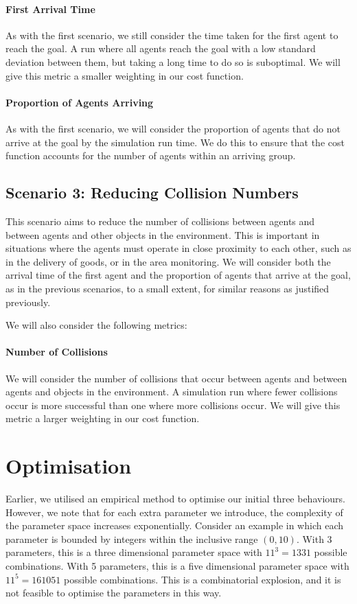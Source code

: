 \documentclass[12pt]{article}
\begin{document}
\paragraph{First Arrival Time} As with the first scenario, we still consider the time taken for the first agent to reach the goal. A run where all agents reach the goal with a low standard deviation between them, but taking a long time to do so is suboptimal. We will give this metric a smaller weighting in our cost function.

\paragraph{Proportion of Agents Arriving} As with the first scenario, we will consider the proportion of agents that do not arrive at the goal by the simulation run time. We do this to ensure that the cost function accounts for the number of agents within an arriving group.

\subsection{Scenario 3: Reducing Collision Numbers}
This scenario aims to reduce the number of collisions between agents and between agents and other objects in the environment. This is important in situations where the agents must operate in close proximity to each other, such as in the delivery of goods, or in the area monitoring. We will consider both the arrival time of the first agent and the proportion of agents that arrive at the goal, as in the previous scenarios, to a small extent, for similar reasons as justified previously.

We will also consider the following metrics: 

\paragraph{Number of Collisions} We will consider the number of collisions that occur between agents and between agents and objects in the environment. A simulation run where fewer collisions occur is more successful than one where more collisions occur. We will give this metric a larger weighting in our cost function.

\section{Optimisation}
Earlier, we utilised an empirical method to optimise our initial three behaviours. However, we note that for each extra parameter we introduce, the complexity of the parameter space increases exponentially. Consider an example in which each parameter is bounded by integers within the inclusive range $(0,10)$. With 3 parameters, this is a three dimensional parameter space with $11^3 = 1331$ possible combinations. With 5 parameters, this is a five dimensional parameter space with $11^5 = 161051$ possible combinations. This is a combinatorial explosion, and it is not feasible to optimise the parameters in this way.
\end{document}
